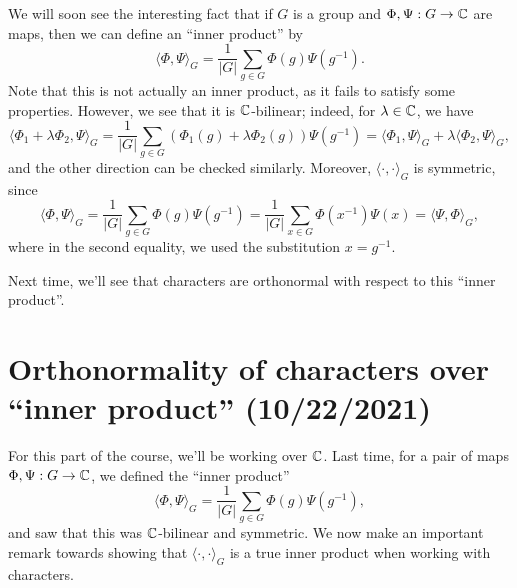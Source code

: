 We will soon see the interesting fact that if $G$ is a group and 
$\Phi, \Psi : G \to \mathbb{C}$ are maps, then we can define an ``inner product'' by 
\[ \langle \Phi, \Psi \rangle_G = \frac{1}{|G|} \sum_{g \in G} \Phi(g) 
\Psi(g^{-1}). \] 
Note that this is not actually an inner product, as it fails to satisfy 
some properties. However, we see that it is $\mathbb{C}$-bilinear; indeed, for 
$\lambda \in \mathbb{C}$, we have 
\[ \langle \Phi_1 + \lambda\Phi_2, \Psi \rangle_G = 
\frac{1}{|G|} \sum_{g \in G} (\Phi_1(g) + \lambda\Phi_2(g)) \Psi(g^{-1}) 
= \langle \Phi_1, \Psi \rangle_G + \lambda \langle \Phi_2, \Psi \rangle_G, \] 
and the other direction can be checked similarly. Moreover, 
$\langle \cdot, \cdot \rangle_G$ is symmetric, since 
\[ \langle \Phi, \Psi \rangle_G = \frac1{|G|} \sum_{g\in G} 
\Phi(g) \Psi(g^{-1}) = \frac1{|G|} \sum_{x\in G} \Phi(x^{-1}) \Psi(x) 
= \langle \Psi, \Phi \rangle_G, \] 
where in the second equality, we used the substitution $x = g^{-1}$. 

Next time, we'll see that characters are orthonormal with respect to this 
``inner product''. 

\section{Orthonormality of characters over ``inner product'' (10/22/2021)}
For this part of the course, we'll be working over $\mathbb{C}$. Last time, 
for a pair of maps $\Phi, \Psi : G \to \mathbb{C}$, we defined the ``inner product''
\[ \langle \Phi, \Psi \rangle_G = \frac{1}{|G|} \sum_{g \in G} \Phi(g) 
\Psi(g^{-1}), \] 
and saw that this was $\mathbb{C}$-bilinear and symmetric. We now make an important 
remark towards showing that $\langle \cdot, \cdot \rangle_G$ is a 
true inner product when working with characters. 

